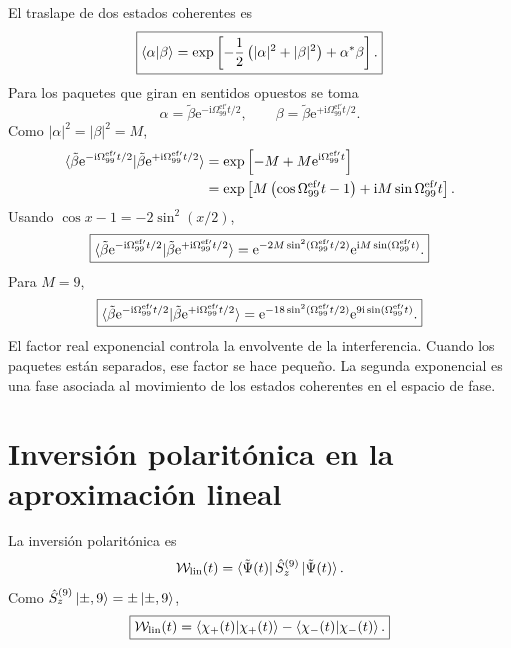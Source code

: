 \documentclass[11pt]{article}
\newcommand{\ii}{\mathrm{i}}
\newcommand{\ee}{\mathrm{e}}
\begin{document}
El traslape de dos estados coherentes es
\begin{equation}
  \boxed{
  \braket{\alpha|\beta}
  =
  \exp\left[
  -\frac12\left(|\alpha|^2+|\beta|^2\right)
  +\alpha^*\beta
  \right].
  }
\end{equation}
Para los paquetes que giran en sentidos opuestos se toma
\begin{equation}
  \alpha
  =
  \tilde\beta\ee^{-\ii\Omega_{99}^{\mathrm{ef}\prime}t/2},
  \qquad
  \beta
  =
  \tilde\beta\ee^{+\ii\Omega_{99}^{\mathrm{ef}\prime}t/2}.
\end{equation}
Como $|\alpha|^2=|\beta|^2=M$,
\begin{align}
  \braket{
  \tilde\beta\ee^{-\ii\Omega_{99}^{\mathrm{ef}\prime}t/2}
  |
  \tilde\beta\ee^{+\ii\Omega_{99}^{\mathrm{ef}\prime}t/2}}
  &=
  \exp\left[
  -M+M\ee^{\ii\Omega_{99}^{\mathrm{ef}\prime}t}
  \right]
  \\
  &=
  \exp\left[
  M\left(\cos\Omega_{99}^{\mathrm{ef}\prime}t-1\right)
  +\ii M\sin\Omega_{99}^{\mathrm{ef}\prime}t
  \right].
\end{align}
Usando $\cos x-1=-2\sin^2(x/2)$,
\begin{equation}
  \boxed{
  \braket{
  \tilde\beta\ee^{-\ii\Omega_{99}^{\mathrm{ef}\prime}t/2}
  |
  \tilde\beta\ee^{+\ii\Omega_{99}^{\mathrm{ef}\prime}t/2}}
  =
  \ee^{-2M\sin^2(\Omega_{99}^{\mathrm{ef}\prime}t/2)}
  \ee^{\ii M\sin(\Omega_{99}^{\mathrm{ef}\prime}t)}.
  }
\end{equation}
Para $M=9$,
\begin{equation}
  \boxed{
  \braket{
  \tilde\beta\ee^{-\ii\Omega_{99}^{\mathrm{ef}\prime}t/2}
  |
  \tilde\beta\ee^{+\ii\Omega_{99}^{\mathrm{ef}\prime}t/2}}
  =
  \ee^{-18\sin^2(\Omega_{99}^{\mathrm{ef}\prime}t/2)}
  \ee^{9\ii\sin(\Omega_{99}^{\mathrm{ef}\prime}t)}.
  }
\end{equation}
El factor real exponencial controla la envolvente de la interferencia. Cuando
los paquetes est\'an separados, ese factor se hace peque\~no. La segunda
exponencial es una fase asociada al movimiento de los estados coherentes en el
espacio de fase.

\section{Inversi\'on polarit\'onica en la aproximaci\'on lineal}

La inversi\'on polarit\'onica es
\begin{equation}
  \mathcal W_{\mathrm{lin}}(t)
  =
  \bra{\tilde\Psi(t)}\hat S_z^{(9)}\ket{\tilde\Psi(t)}.
\end{equation}
Como $\hat S_z^{(9)}\ket{\pm,9}=\pm\ket{\pm,9}$,
\begin{equation}
  \boxed{
  \mathcal W_{\mathrm{lin}}(t)
  =
  \braket{\chi_+(t)|\chi_+(t)}
  -
  \braket{\chi_-(t)|\chi_-(t)}.
  }
\end{equation}
\end{document}
